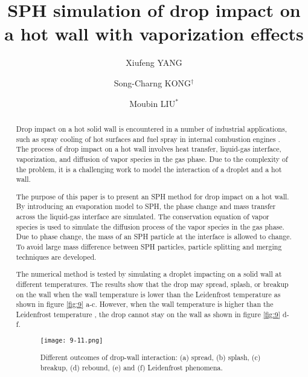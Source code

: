 \documentclass[10pt]{article}
\title{SPH simulation of drop impact on a hot wall with vaporization effects}
\date{}
\author[1]{Xiufeng YANG}
\author[1]{Song-Charng KONG$^\dagger$}
\affil[1]{Iowa State University, USA}
\author[2]{Moubin LIU$^*$}
\affil[2]{Peking University, China}
\affil[$\relax$]{\email{\dagger}{kong@iastate.edu}, \email{*}{mbliu@pku.edu.cn}}
\begin{document}
\maketitle


\begin{abstract}
Drop impact on a hot solid wall is encountered in a number of industrial applications, such as spray cooling of hot surfaces and fuel spray in internal combustion engines \cite{moita2007drop,yang2017simulation}. The process of drop impact on a hot wall involves heat transfer, liquid-gas interface, vaporization, and diffusion of vapor species in the gas phase. Due to the complexity of the problem, it is a challenging work to model the interaction of a droplet and a hot wall.

The purpose of this paper is to present an SPH method for drop impact on a hot wall. By introducing an evaporation model to SPH, the phase change and mass transfer across the liquid-gas interface are simulated. The conservation equation of vapor species is used to simulate the diffusion process of the vapor species in the gas phase. Due to phase change, the mass of an SPH particle at the interface is allowed to change. To avoid large mass difference between SPH particles, particle splitting and merging techniques are developed.

The numerical method is tested by simulating a droplet impacting on a solid wall at different temperatures. The results show that the drop may spread, splash, or breakup on the wall when the wall temperature is lower than the Leidenfrost temperature as shown in figure \ref{fig:9} a-c. However, when the wall temperature is higher than the Leidenfrost temperature \cite{quere2013leidenfrost}, the drop cannot stay on the wall as shown in figure \ref{fig:9} d-f. 


\begin{figure}[!htb]
\centering
\texttt{[image: 9-11.png]}
\caption{Different outcomes of drop-wall interaction: (a) spread, (b) splash, (c) breakup, (d) rebound, (e) and (f) Leidenfrost phenomena.}\label{fig:9}
\end{figure}

\end{abstract}



\addbib
\end{document}
